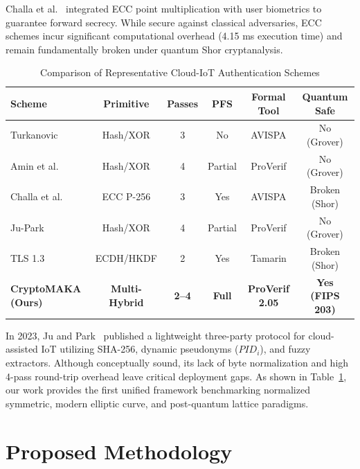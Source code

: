 \documentclass[journal,10pt,twocolumn]{IEEEtran}
\begin{document}
Challa et al.~\cite{challa2018} integrated ECC point multiplication with user biometrics to guarantee forward secrecy. While secure against classical adversaries, ECC schemes incur significant computational overhead (4.15 ms execution time) and remain fundamentally broken under quantum Shor cryptanalysis.

\begin{table}[htbp]
\caption{Comparison of Representative Cloud-IoT Authentication Schemes}
\begin{center}
\begin{tabular}{lccccc}
\toprule
\textbf{Scheme} & \textbf{Primitive} & \textbf{Passes} & \textbf{PFS} & \textbf{Formal Tool} & \textbf{Quantum Safe} \\
\midrule
Turkanovic~\cite{turkanovic2014} & Hash/XOR & 3 & No & AVISPA & No (Grover) \\
Amin et al.~\cite{amin2016} & Hash/XOR & 4 & Partial & ProVerif & No (Grover) \\
Challa et al.~\cite{challa2018} & ECC P-256 & 3 & Yes & AVISPA & Broken (Shor) \\
Ju-Park~\cite{jupark2023} & Hash/XOR & 4 & Partial & ProVerif & No (Grover) \\
TLS 1.3~\cite{rfc8446} & ECDH/HKDF & 2 & Yes & Tamarin & Broken (Shor) \\
\textbf{CryptoMAKA (Ours)} & \textbf{Multi-Hybrid} & \textbf{2--4} & \textbf{Full} & \textbf{ProVerif 2.05} & \textbf{Yes (FIPS 203)} \\
\bottomrule
\end{tabular}
\label{tab:lit_comparison}
\end{center}
\end{table}

In 2023, Ju and Park~\cite{jupark2023} published a lightweight three-party protocol for cloud-assisted IoT utilizing SHA-256, dynamic pseudonyms ($PID_i$), and fuzzy extractors. Although conceptually sound, its lack of byte normalization and high 4-pass round-trip overhead leave critical deployment gaps. As shown in Table~\ref{tab:lit_comparison}, our work provides the first unified framework benchmarking normalized symmetric, modern elliptic curve, and post-quantum lattice paradigms.

\section{Proposed Methodology}
\end{document}

